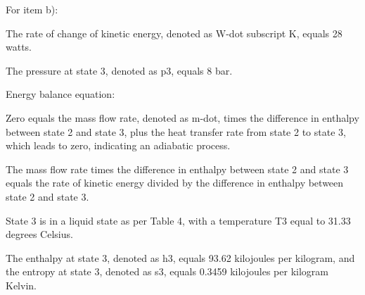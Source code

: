 For item b):

The rate of change of kinetic energy, denoted as W-dot subscript K, equals 28 watts.

The pressure at state 3, denoted as p3, equals 8 bar.

Energy balance equation:

Zero equals the mass flow rate, denoted as m-dot, times the difference in enthalpy between state 2 and state 3, plus the heat transfer rate from state 2 to state 3, which leads to zero, indicating an adiabatic process.

The mass flow rate times the difference in enthalpy between state 2 and state 3 equals the rate of kinetic energy divided by the difference in enthalpy between state 2 and state 3.

State 3 is in a liquid state as per Table 4, with a temperature T3 equal to 31.33 degrees Celsius.

The enthalpy at state 3, denoted as h3, equals 93.62 kilojoules per kilogram, and the entropy at state 3, denoted as s3, equals 0.3459 kilojoules per kilogram Kelvin.